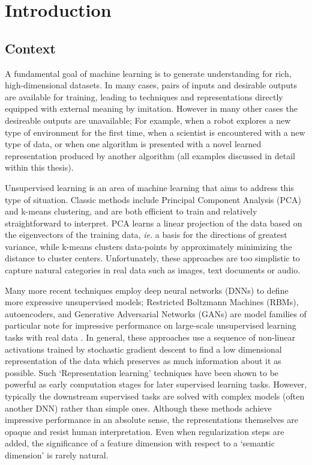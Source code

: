 \chapter{Introduction} \label{ch:intro}

\section{Context}
A fundamental goal of machine learning is to generate understanding for rich, high-dimensional datasets.
In many cases, pairs of inputs and desirable outputs are available for training, leading to techniques and representations directly equipped with external meaning by imitation. However in many other cases the desireable outputs are unavailable; For example, when a robot explores a new type of environment for the first time, when a scientist is encountered with a new type of data, or when one algorithm is presented with a novel learned representation produced by another algorithm (all examples discussed in detail within this thesis).

Unsupervised learning is an area of machine learning that aims to address this type of situation. Classic methods include Principal Component Analysis (PCA) and k-means clustering, and are both efficient to train and relatively straightforward to interpret. PCA learns a linear projection of the data based on the eigenvectors of the training data, \emph{ie.} a basis for the directions of greatest variance, while k-means clusters data-points by approximately minimizing the distance to cluster centers. Unfortunately, these approaches are too simplistic to capture natural categories in real data such as images, text documents or audio.

Many more recent techniques employ deep neural networks (DNNs) to define more expressive unsupervised models; Restricted Boltzmann Machines (RBMs), autoencoders, and Generative Adversarial Networks (GANs) are model families of particular note for impressive performance on large-scale unsupervised learning tasks with real data \citep{Bengio2013,Goodfellow2014}. In general, these approaches use a sequence of non-linear activations trained by stochastic gradient descent to find a low dimensional representation of the data which preserves as much information about it as possible. Such `Representation learning' techniques have been shown to be powerful as early computation stages for later supervised learning tasks. However, typically the downstream supervised tasks are solved with complex models (often another DNN) rather than simple ones. Although these methods achieve impressive performance in an absolute sense, the representations themselves are opaque and resist human interpretation. Even when regularization steps are added, the significance of a feature dimension with respect to a `semantic dimension' is rarely natural.

